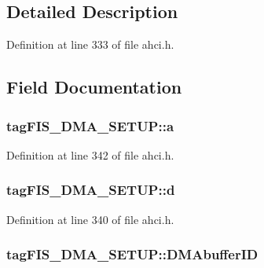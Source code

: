 \subsection{Detailed Description}


Definition at line 333 of file ahci.\+h.



\subsection{Field Documentation}
\subsubsection[{\texorpdfstring{a}{a}}]{ tag\+F\+I\+S\+\_\+\+D\+M\+A\+\_\+\+S\+E\+T\+U\+P\+::a}\hypertarget{structtagFIS__DMA__SETUP_ae029fb312376fa0aba35b4a0b4ac8e29}{}\label{structtagFIS__DMA__SETUP_ae029fb312376fa0aba35b4a0b4ac8e29}


Definition at line 342 of file ahci.\+h.

\subsubsection[{\texorpdfstring{d}{d}}]{ tag\+F\+I\+S\+\_\+\+D\+M\+A\+\_\+\+S\+E\+T\+U\+P\+::d}\hypertarget{structtagFIS__DMA__SETUP_ac2757369abeaffe2c5cc0ce30db3ce89}{}\label{structtagFIS__DMA__SETUP_ac2757369abeaffe2c5cc0ce30db3ce89}


Definition at line 340 of file ahci.\+h.

\subsubsection[{\texorpdfstring{D\+M\+Abuffer\+ID}{DMAbufferID}}]{ tag\+F\+I\+S\+\_\+\+D\+M\+A\+\_\+\+S\+E\+T\+U\+P\+::\+D\+M\+Abuffer\+ID}\hypertarget{structtagFIS__DMA__SETUP_a2ec10ff5b229801bd13d829c5d7abf5a}{}\label{structtagFIS__DMA__SETUP_a2ec10ff5b229801bd13d829c5d7abf5a}


